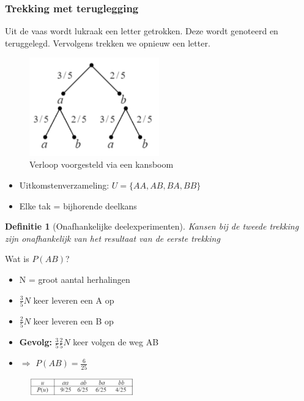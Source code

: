 \documentclass{article}
\newtheorem{theorem}{Definitie}[section]
\begin{document}
\subsubsection{Trekking met teruglegging}

Uit de vaas wordt lukraak een letter getrokken. Deze wordt genoteerd
en teruggelegd. Vervolgens trekken we opnieuw een letter.

\begin{figure}[H]
    \centering
    \includegraphics[width=0.5\textwidth]{trekking-met-teruglegging-kansboom.png}
    \caption{Verloop voorgesteld via een kansboom}
\end{figure}

\begin{itemize}
    \item Uitkomstenverzameling: $U = \{AA, AB, BA, BB\}$
    \item Elke tak = bijhorende deelkans
\end{itemize}

\begin{theorem}[Onafhankelijke deelexperimenten]
    Kansen bij de tweede trekking zijn onafhankelijk van het resultaat van de eerste trekking
\end{theorem}

Wat is $P(AB)$?

\begin{itemize}
    \item N = groot aantal herhalingen
    \item $\frac{3}{5}N$ keer leveren een A op
    \item $\frac{2}{5}N$ keer leveren een B op
    \item \textbf{Gevolg:} $\frac35 \frac25 N$ keer volgen de weg AB
    \item $\Rightarrow$ $P(AB) = \frac{6}{25}$
\end{itemize}

\begin{figure}[H]
    \centering
    \includegraphics[width=0.4\textwidth]{trekking-met-teruglegging-tabel.png}
\end{figure}
\end{document}
